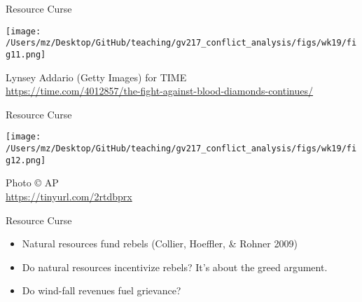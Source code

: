 \documentclass[handout]{beamer}
\begin{document}
\begin{frame}{Resource Curse}
    \pause
    \begin{center}
        \texttt{[image: /Users/mz/Desktop/GitHub/teaching/gv217\_conflict\_analysis/figs/wk19/fig11.png]}
    \end{center}
    \tiny Lynsey Addario (Getty Images) for TIME\\ \url{https://time.com/4012857/the-fight-against-blood-diamonds-continues/}
\end{frame}

\begin{frame}{Resource Curse}
    \pause
    \begin{center}
        \texttt{[image: /Users/mz/Desktop/GitHub/teaching/gv217\_conflict\_analysis/figs/wk19/fig12.png]}
    \end{center}
    \tiny Photo © AP\\ \url{https://tinyurl.com/2rtdbprx}
\end{frame}

\begin{frame}{Resource Curse}
    \begin{itemize}
        \pause\item Natural resources fund rebels (Collier, Hoeffler, \& Rohner 2009)
        \pause\item Do natural resources incentivize rebels? It's about the greed argument.
        \pause\item Do wind-fall revenues fuel grievance?
    \end{itemize}
\end{frame}
\end{document}
